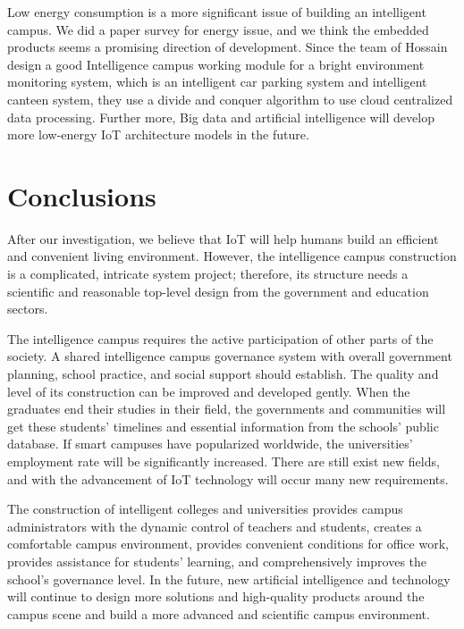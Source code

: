 \documentclass[conference]{IEEEtran}
\begin{document}
Low energy consumption is a more significant issue of building an intelligent campus. We did a paper survey for energy issue, and we think the embedded products seems a promising direction of development. Since the team of Hossain design a good Intelligence campus working module for a bright environment monitoring system, which is an intelligent car parking system and intelligent canteen system, they use a divide and conquer algorithm to use cloud centralized data processing. Further more, Big data and artificial intelligence will develop more low-energy IoT architecture models in the future. 

\section{Conclusions}
After our investigation, we believe that IoT will help humans build an efficient and convenient living environment. However, the intelligence campus construction is a complicated, intricate system project; therefore, its structure needs a scientific and reasonable top-level design from the government and education sectors.

The intelligence campus requires the active participation of other parts of the society.  A shared intelligence campus governance system with overall government planning, school practice, and social support should establish. The quality and level of its construction can be improved and developed gently. When the graduates end their studies in their field, the governments and communities will get these students' timelines and essential information from the schools' public database. If smart campuses have popularized worldwide, the universities' employment rate will be significantly increased. There are still exist new fields, and with the advancement of IoT technology will occur many new requirements.

The construction of intelligent colleges and universities provides campus administrators with the dynamic control of teachers and students, creates a comfortable campus environment, provides convenient conditions for office work, provides assistance for students' learning, and comprehensively improves the school's governance level. In the future, new artificial intelligence and technology will continue to design more solutions and high-quality products around the campus scene and build a more advanced and scientific campus environment.









\vspace{12pt}
\end{document}
